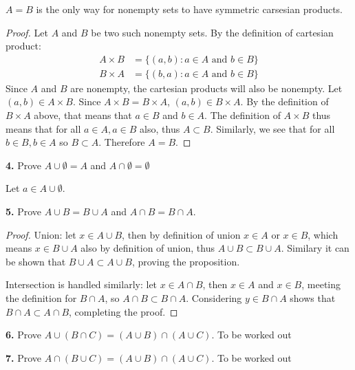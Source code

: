 \documentclass[12pt]{amsart}
\newenvironment{statement}[1]{\smallskip\noindent\color[rgb]{1.00,0.00,0.50} {\bf #1.}}{}
\theoremstyle{definition}
\theoremstyle{remark}
\begin{document}
$A = B$ is the only way for nonempty sets to have symmetric carsesian
products.
\begin{proof}
Let $A$ and $B$ be two such nonempty sets. By the definition of cartesian product:
\begin{align*}
  A \times B &= \{ (a,b) : a \in A \text{ and } b \in B \} \\
  B \times A &= \{ (b,a) : a \in A \text{ and } b \in B \}
\end{align*}
Since $A$ and $B$ are nonempty, the cartesian products will also be
nonempty. Let $(a,b) \in A \times B$. Since $A \times B = B \times A$,
$(a,b) \in B \times A$. By the definition of $B \times A$ above, that
means that $a \in B$ and $b \in A$. The definition of $A \times B$
thus means that for all $a \in A, a \in B$ also, thus $A \subset
B$. Similarly, we see that for all $b \in B, b \in A$ so $B \subset
A$. Therefore $A=B$.
\end{proof}


\begin{statement}{4}
Prove $A \cup \emptyset = A$ and $A \cap \emptyset = \emptyset $
\end{statement}

Let $a \in A \cup \emptyset$. 


\begin{statement}{5}
Prove $A \cup B = B \cup A$ and $A \cap B = B \cap A$.
\end{statement}
\begin{proof}
Union: let $ x \in A \cup B$, then by definition of union $x \in A$ or
$x \in B$, which means $x \in B \cup A$ also by definition of union, thus $A
\cup B \subset B \cup A$. Similary it can be shown that $B \cup A
\subset A \cup B$, proving the proposition.

Intersection is handled similarly: let $x \in A \cap B$, then $x \in
A$ and $x \in B$, meeting the definition for $B \cap A$, so $A \cap B
\subset B \cap A$. Considering $y \in B \cap A$ shows that $B \cap A
\subset A \cap B$, completing the proof.
\end{proof}

\begin{statement}{6}
Prove $A \cup (B \cap C) = (A \cup B) \cap (A \cup C)$.
\end{statement}
To be worked out


\begin{statement}{7}
Prove $A \cap (B \cup C) = (A \cup B) \cap (A \cup C)$.
\end{statement}
To be worked out
\end{document}
